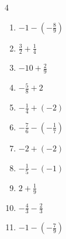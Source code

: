 \begin{multicols}{4}
\begin{enumerate}

\columnbreak %

\resetques

  \item $\displaystyle -1 - \left(-\frac{8}{9}\right)$


  \item $\displaystyle \frac{3}{2} + \frac{1}{4}$


  \item $\displaystyle -10 + \frac{2}{9}$


  \item $\displaystyle -\frac{5}{8} + 2$


  \item $\displaystyle -\frac{1}{4} + \left(-2\right)$


  \item $\displaystyle -\frac{7}{6} - \left(-\frac{1}{7}\right)$


  \item $\displaystyle -2 + \left(-2\right)$

        \phantom{$\displaystyle =-4$}

  \item $\displaystyle -\frac{1}{5} - \left(-1\right)$


  \item $\displaystyle 2 + \frac{1}{9}$


  \item $\displaystyle -\frac{4}{3} - \frac{2}{3}$

        \phantom{$\displaystyle =-2$}

\columnbreak %

  \item $\displaystyle -1 - \left(-\frac{7}{9}\right)$



\end{enumerate}
\end{multicols}
